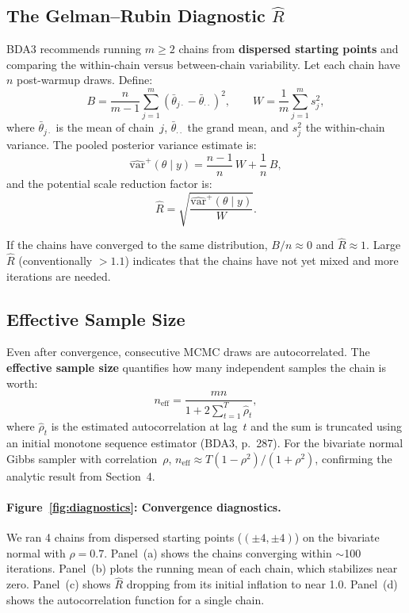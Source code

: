 \documentclass[11pt]{article}
\begin{document}
\subsection{The Gelman--Rubin Diagnostic $\hat{R}$}

BDA3 recommends running $m \ge 2$ chains from \textbf{dispersed starting points} and comparing the within-chain versus between-chain variability.  Let each chain have $n$ post-warmup draws.  Define:
\[
  B = \frac{n}{m-1}\sum_{j=1}^{m}(\bar{\theta}_{j\cdot} - \bar{\theta}_{\cdot\cdot})^2, \qquad
  W = \frac{1}{m}\sum_{j=1}^{m} s_j^2,
\]
where $\bar{\theta}_{j\cdot}$ is the mean of chain~$j$, $\bar{\theta}_{\cdot\cdot}$ the grand mean, and $s_j^2$ the within-chain variance.  The pooled posterior variance estimate is:
\[
  \widehat{\text{var}}^+(\theta \mid y) = \frac{n-1}{n}\,W + \frac{1}{n}\,B,
\]
and the potential scale reduction factor is:
\[
  \hat{R} = \sqrt{\frac{\widehat{\text{var}}^+(\theta \mid y)}{W}}.
\]

If the chains have converged to the same distribution, $B/n \approx 0$ and $\hat{R} \approx 1$.  Large $\hat{R}$ (conventionally $> 1.1$) indicates that the chains have not yet mixed and more iterations are needed.

\subsection{Effective Sample Size}

Even after convergence, consecutive MCMC draws are autocorrelated.  The \textbf{effective sample size} quantifies how many independent samples the chain is worth:
\[
  n_{\text{eff}} = \frac{mn}{1 + 2\sum_{t=1}^{T} \hat{\rho}_t},
\]
where $\hat{\rho}_t$ is the estimated autocorrelation at lag~$t$ and the sum is truncated using an initial monotone sequence estimator (BDA3, p.~287).  For the bivariate normal Gibbs sampler with correlation~$\rho$, $n_{\text{eff}} \approx T(1-\rho^2)/(1+\rho^2)$, confirming the analytic result from Section~4.

\paragraph{Figure~\ref{fig:diagnostics}: Convergence diagnostics.}
We ran 4 chains from dispersed starting points ($(\pm 4, \pm 4)$) on the bivariate normal with $\rho = 0.7$.  Panel~(a) shows the chains converging within $\sim$100 iterations.  Panel~(b) plots the running mean of each chain, which stabilizes near zero.  Panel~(c) shows $\hat{R}$ dropping from its initial inflation to near 1.0.  Panel~(d) shows the autocorrelation function for a single chain.
\end{document}
